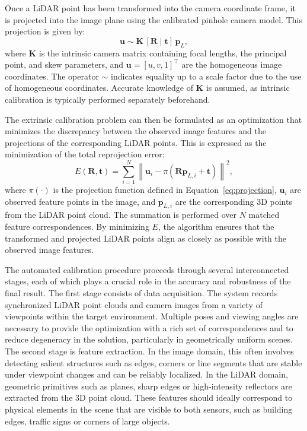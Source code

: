 \documentclass[english, bachelor, utf8]{base/thesis_telematics}
\begin{document}
Once a LiDAR point has been transformed into the camera coordinate frame, it is projected into the image plane using the calibrated pinhole camera model. 
This projection is given by:
\begin{equation}
\mathbf{u} \sim \mathbf{K} \, [\mathbf{R} \;|\; \mathbf{t}] \, \mathbf{p}_L,
\label{eq:projection}
\end{equation}
where $\mathbf{K}$ is the intrinsic camera matrix containing focal lengths, the principal point, and skew parameters, and $\mathbf{u} = [u, v, 1]^\top$ are 
the homogeneous image coordinates. The operator $\sim$ indicates equality up to a scale factor due to the use of homogeneous coordinates. Accurate knowledge 
of $\mathbf{K}$ is assumed, as intrinsic calibration is typically performed separately beforehand.

The extrinsic calibration problem can then be formulated as an optimization that minimizes the discrepancy between the observed image features and the 
projections of the corresponding LiDAR points. This is expressed as the minimization of the total reprojection error:
\begin{equation}
E(\mathbf{R}, \mathbf{t}) =
\sum_{i=1}^N \left\| \mathbf{u}_i -
\pi\left( \mathbf{R} \mathbf{p}_{L,i} + \mathbf{t} \right) \right\|^2,
\label{eq:reprojection_error}
\end{equation}
where $\pi(\cdot)$ is the projection function defined in Equation~\ref{eq:projection}, $\mathbf{u}_i$ are observed feature points in the image, and $\mathbf{p}_{L,i}$ 
are the corresponding 3D points from the LiDAR point cloud. The summation is performed over $N$ matched feature correspondences. By minimizing $E$, the algorithm ensures 
that the transformed and projected LiDAR points align as closely as possible with the observed image features.

The automated calibration procedure proceeds through several interconnected stages, each of which plays a crucial role in the accuracy and robustness of the final result. 
The first stage consists of data acquisition. The system records synchronized LiDAR point clouds and camera images from a variety of viewpoints within the target environment. 
Multiple poses and viewing angles are necessary to provide the optimization with a rich set of correspondences and to reduce
degeneracy in the solution, particularly in geometrically uniform scenes.
The second stage is feature extraction. In the image domain, this often involves detecting salient structures such as edges, corners or line segments that are stable 
under viewpoint changes and can be reliably localized. In the LiDAR domain, geometric primitives such as planes, sharp edges or high-intensity reflectors are extracted 
from the 3D point cloud. These features should ideally correspond to physical elements in the scene that are visible to both sensors, such as building edges, traffic signs
or corners of large objects.
\end{document}
